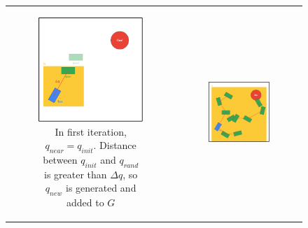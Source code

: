 \begin{figure}[H]
\begin{center}
\begin{tabular}{c c}
    \begin{subfigure}{0.45\textwidth}
    \includegraphics[width=\linewidth]{chapters/chapter2/img/RRT_step_by_step-C.png}
    \caption{In first iteration, $q_{near} = q_{init}$. Distance between $q_{init}$ and $q_{rand}$ is greater than $\Delta q$, so $q_{new}$ is generated and added to $G$}
    \label{subfig:rrt-step-by-step-C}
    \end{subfigure} &
    \begin{subfigure}{0.45\textwidth}
    \includegraphics[width=\linewidth]{chapters/chapter2/img/RRT_step_by_step-D.png}

\end{subfigure}
\end{tabular}
\end{center}
\end{figure}
